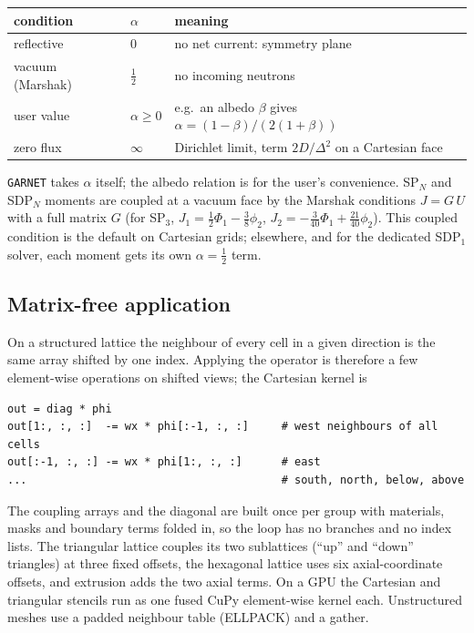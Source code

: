\documentclass[a4paper,10pt]{article}
\newcommand{\garnet}{\texttt{GARNET}}
\begin{document}
\begin{center}
\begin{tabular}{lll}
\hline
condition & $\alpha$ & meaning\\
\hline
reflective & 0 & no net current: symmetry plane\\
vacuum (Marshak) & $\frac12$ & no incoming neutrons\\
user value & $\alpha\ge0$ & e.g.\ an albedo $\beta$ gives $\alpha = (1-\beta)/(2(1+\beta))$\\
zero flux & $\infty$ & Dirichlet limit, term $2D/\Delta^2$ on a Cartesian face\\
\hline
\end{tabular}
\end{center}

\garnet{} takes $\alpha$ itself; the albedo relation is for the user's
convenience. SP$_N$ and SDP$_N$ moments are coupled at a vacuum face by the
Marshak conditions $J = G\,U$ with a full matrix $G$ (for SP$_3$, $J_1 =
\frac12\Phi_1 - \frac38\phi_2$, $J_2 = -\frac{3}{40}\Phi_1 + \frac{21}{40}\phi_2$).
This coupled condition is the default on Cartesian grids; elsewhere, and for the
dedicated SDP$_1$ solver, each moment gets its own $\alpha = \frac12$ term.

\subsection{Matrix-free application}
\label{sec:matrixfree}

On a structured lattice the neighbour of every cell in a given direction is the
same array shifted by one index. Applying the operator is therefore a few
element-wise operations on shifted views; the Cartesian kernel is
\begin{verbatim}
out = diag * phi
out[1:, :, :]  -= wx * phi[:-1, :, :]     # west neighbours of all cells
out[:-1, :, :] -= wx * phi[1:, :, :]      # east
...                                       # south, north, below, above
\end{verbatim}
The coupling arrays and the diagonal are built once per group with materials,
masks and boundary terms folded in, so the loop has no branches and no index
lists. The triangular lattice couples its two sublattices (``up'' and ``down''
triangles) at three fixed offsets, the hexagonal lattice uses six
axial-coordinate offsets, and extrusion adds the two axial terms. On a GPU the
Cartesian and triangular stencils run as one fused CuPy element-wise kernel each.
Unstructured meshes use a padded neighbour table (ELLPACK) and a gather.
\end{document}

